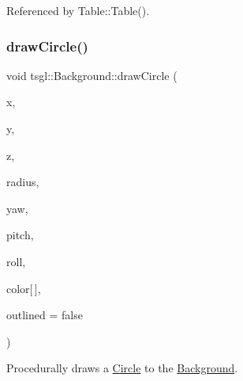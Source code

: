 Referenced by Table\+::\+Table().

\mbox{\label{classtsgl_1_1_background_aa9f5d0819442512216cbe6164501e306}} 
\subsubsection{\texorpdfstring{draw\+Circle()}{drawCircle()}\hspace{0.1cm}{\footnotesize\ttfamily [2/2]}}
{\footnotesize\ttfamily void tsgl\+::\+Background\+::draw\+Circle (\begin{DoxyParamCaption}\item[{float}]{x,  }\item[{float}]{y,  }\item[{float}]{z,  }\item[{float}]{radius,  }\item[{float}]{yaw,  }\item[{float}]{pitch,  }\item[{float}]{roll,  }\item[{\hyperlink{structtsgl_1_1_color_float}{Color\+Float}}]{color\mbox{[}$\,$\mbox{]},  }\item[{bool}]{outlined = {\ttfamily false} }\end{DoxyParamCaption})\hspace{0.3cm}{\ttfamily [virtual]}}



Procedurally draws a \hyperlink{classtsgl_1_1_circle}{Circle} to the \hyperlink{classtsgl_1_1_background}{Background}. 

